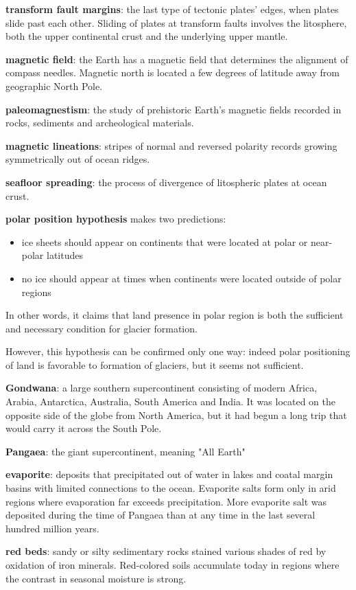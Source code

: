 \textbf{transform fault margins}: the last type of tectonic plates' edges, when
plates slide past each other. Sliding of plates at transform faults involves
the litosphere, both the upper continental crust and the underlying upper
mantle.

\textbf{magnetic field}: the Earth has a magnetic field that determines the
alignment of compass needles. Magnetic north is located a few degrees of
latitude away from geographic North Pole.

\textbf{paleomagnestism}: the study of prehistoric Earth's magnetic fields
recorded in rocks, sediments and archeological materials.

\textbf{magnetic lineations}: stripes of normal and reversed polarity records
growing symmetrically out of ocean ridges.

\textbf{seafloor spreading}: the process of divergence of litospheric plates
at ocean crust.

\textbf{polar position hypothesis} makes two predictions:
\begin{itemize}
	\item ice sheets should appear on continents that were located at
	polar or near-polar latitudes
	\item no ice should appear at times when continents were located
	outside of polar regions
\end{itemize}
In other words, it claims that land presence in polar region is both the
sufficient and necessary condition for glacier formation.

However, this hypothesis can be confirmed only one way: indeed polar
positioning of land is favorable to formation of glaciers, but it seems
not sufficient.

\textbf{Gondwana}: a large southern supercontinent consisting of modern
Africa, Arabia, Antarctica, Australia, South America and India. It was located
on the opposite side of the globe from North America, but it had begun a long
trip that would carry it across the South Pole.

\textbf{Pangaea}: the giant supercontinent, meaning "All Earth"

\textbf{evaporite}: deposits that precipitated out of water in lakes and
coatal margin basins with limited connections to the ocean. Evaporite salts
form only in arid regions where evaporation far exceeds precipitation.
More evaporite salt was deposited during the time of Pangaea than at any time
in the last several hundred million years.

\textbf{red beds}: sandy or silty sedimentary rocks stained various shades of
red by oxidation of iron minerals. Red-colored soils accumulate today in
regions where the contrast in seasonal moisture is strong.

